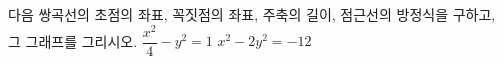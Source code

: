 다음 쌍곡선의 초점의 좌표, 꼭짓점의 좌표, 주축의 길이, 점근선의 방정식을 구하고, 그 그래프를 그리시오.
 $\dfrac{x^2}{4}-y^2=1$
 $x^2-2y^2=-12$

